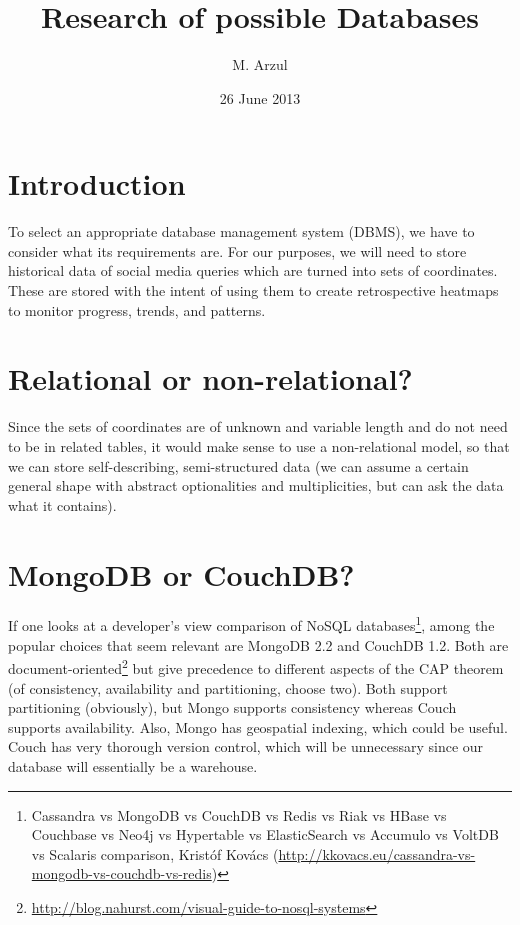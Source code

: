 \documentclass{article}
\title{Research of possible Databases}
\author{M. Arzul}
\date{26 June 2013}
\begin{document}
\maketitle

\section{Introduction}

To select an appropriate database management system (DBMS), we have to consider what its requirements are. For our purposes, we will need to store historical data of social media queries which are turned into sets of coordinates. These are stored with the intent of using them to create retrospective heatmaps to monitor progress, trends, and patterns.

\section{Relational or non-relational?}

Since the sets of coordinates are of unknown and variable length and do not need to be in related tables, it would make sense to use a non-relational model, so that we can store self-describing, semi-structured data (we can assume a certain general shape with abstract optionalities and multiplicities, but can ask the data what it contains).

\section{MongoDB or CouchDB?}

If one looks at a developer's view comparison of NoSQL databases\footnote{Cassandra vs MongoDB vs CouchDB vs Redis vs Riak vs HBase vs Couchbase vs Neo4j vs Hypertable vs ElasticSearch vs Accumulo vs VoltDB vs Scalaris comparison, Krist\'{o}f Kov\'{acs} (\url{http://kkovacs.eu/cassandra-vs-mongodb-vs-couchdb-vs-redis})}, among the popular choices that seem relevant are MongoDB 2.2 and CouchDB 1.2. Both are document-oriented\footnote{\url{http://blog.nahurst.com/visual-guide-to-nosql-systems}} but give precedence to different aspects of the CAP theorem (of consistency, availability and partitioning, choose two). Both support partitioning (obviously), but Mongo supports consistency whereas Couch supports availability. Also, Mongo has geospatial indexing, which could be useful. Couch has very thorough version control, which will be unnecessary since our database will essentially be a warehouse.
\end{document}
